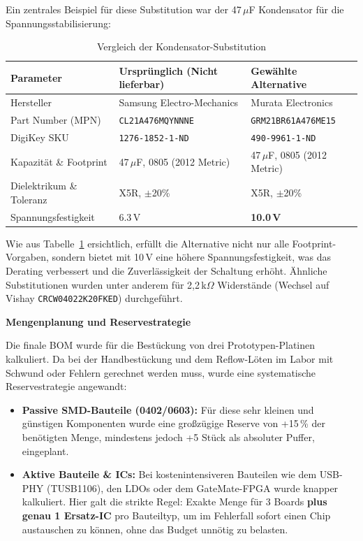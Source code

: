 \documentclass[a4paper,11pt]{article}
\begin{document}
Ein zentrales Beispiel für diese Substitution war der 47\,$\mu$F Kondensator für die Spannungsstabilisierung:
\begin{table}[H]
	\centering
	\begin{tabular}{|l|l|l|}
		\hline
		\textbf{Parameter}       & \textbf{Ursprünglich (Nicht lieferbar)} & \textbf{Gewählte Alternative}  \\ \hline
		Hersteller               & Samsung Electro-Mechanics               & Murata Electronics             \\ \hline
		Part Number (MPN)        & \texttt{CL21A476MQYNNNE}                & \texttt{GRM21BR61A476ME15}     \\ \hline
		DigiKey SKU              & \texttt{1276-1852-1-ND}                 & \texttt{490-9961-1-ND}         \\ \hline
		Kapazität \& Footprint   & 47\,$\mu$F, 0805 (2012 Metric)          & 47\,$\mu$F, 0805 (2012 Metric) \\ \hline
		Dielektrikum \& Toleranz & X5R, $\pm$20\%                          & X5R, $\pm$20\%                 \\ \hline
		Spannungsfestigkeit      & 6.3\,V                                  & \textbf{10.0\,V}               \\ \hline
	\end{tabular}
	\caption{Vergleich der Kondensator-Substitution}
	\label{tab:cap_subst}
\end{table}
Wie aus Tabelle~\ref{tab:cap_subst} ersichtlich, erfüllt die Alternative nicht nur alle Footprint-Vorgaben, sondern bietet mit 10\,V eine höhere Spannungsfestigkeit, was das Derating verbessert und die Zuverlässigkeit der Schaltung erhöht. Ähnliche Substitutionen wurden unter anderem für 2,2\,k$\Omega$ Widerstände (Wechsel auf Vishay \texttt{CRCW04022K20FKED}) durchgeführt.

\vspace{1em}
\textbf{Mengenplanung und Reservestrategie}

Die finale BOM wurde für die Bestückung von drei Prototypen-Platinen kalkuliert. Da bei der Handbestückung und dem Reflow-Löten im Labor mit Schwund oder Fehlern gerechnet werden muss, wurde eine systematische Reservestrategie angewandt:
\begin{itemize}
	\item \textbf{Passive SMD-Bauteile (0402/0603):} Für diese sehr kleinen und günstigen Komponenten wurde eine großzügige Reserve von +15\,\% der benötigten Menge, mindestens jedoch +5 Stück als absoluter Puffer, eingeplant.
	\item \textbf{Aktive Bauteile \& ICs:} Bei kostenintensiveren Bauteilen wie dem USB-PHY (TUSB1106), den LDOs oder dem GateMate-FPGA wurde knapper kalkuliert. Hier galt die strikte Regel: Exakte Menge für 3 Boards \textbf{plus genau 1 Ersatz-IC} pro Bauteiltyp, um im Fehlerfall sofort einen Chip austauschen zu können, ohne das Budget unnötig zu belasten.
\end{itemize}
\end{document}
